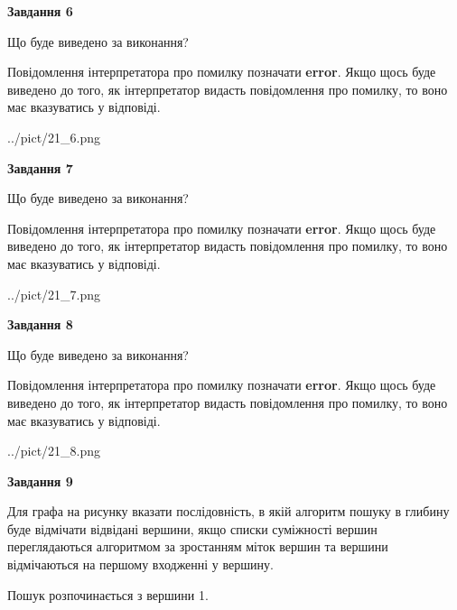 \documentclass[12pt, ukrainian]{article}
\begin{document}
{\begin {large}
{\begin {center}\textbf{Завдання 6}\end {center}}\par
Що буде виведено за виконання?

Повідомлення інтерпретатора про помилку позначати \textbf{error}.
Якщо щось буде виведено до того, як інтерпретатор видасть повідомлення про помилку, 
то воно має вказуватись у відповіді. \par


\begin{center}
	{../pict/21_6.png}
\end{center}
\newpage

{\begin {center}\textbf{Завдання 7}\end {center}}\par
Що буде виведено за виконання?

Повідомлення інтерпретатора про помилку позначати \textbf{error}.
Якщо щось буде виведено до того, як інтерпретатор видасть повідомлення про помилку, 
то воно має вказуватись у відповіді. \par


\begin{center}
	{../pict/21_7.png}
\end{center}
\newpage

{\begin {center}\textbf{Завдання 8}\end {center}}\par
Що буде виведено за виконання?

Повідомлення інтерпретатора про помилку позначати \textbf{error}.
Якщо щось буде виведено до того, як інтерпретатор видасть повідомлення про помилку, 
то воно має вказуватись у відповіді. \par


\begin{center}
	{../pict/21_8.png}
\end{center}
\newpage

{\begin {center}\textbf{Завдання 9}\end {center}}\par
Для графа на рисунку вказати послідовність, в якій алгоритм пошуку в глибину буде відмічати відвідані вершини, якщо списки суміжності вершин переглядаються алгоритмом за зростанням міток вершин та вершини відмічаються на першому вход\-женні у вершину.\par
Пошук розпочинається з вершини 1.\par


\end{large}}
\end{document}
